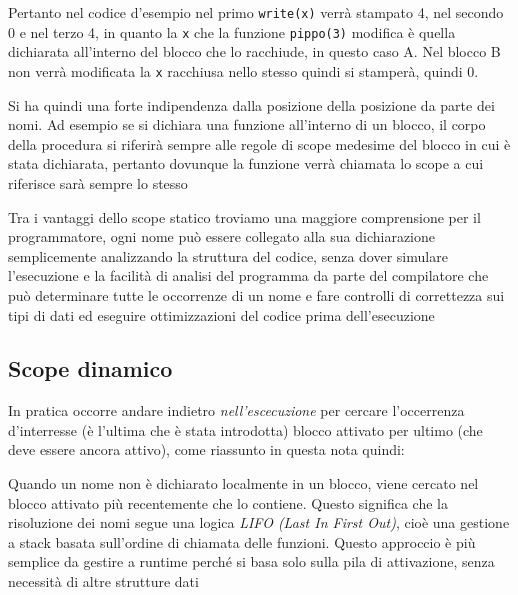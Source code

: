 Pertanto nel codice d'esempio nel primo \texttt{write(x)} verrà stampato 4, nel secondo 0 e nel terzo 4, in quanto la \texttt{x} che la funzione \texttt{pippo(3)} modifica è quella dichiarata all'interno del blocco che lo racchiude, in questo caso A. Nel blocco B non verrà modificata la \texttt{x} racchiusa nello stesso quindi si stamperà, quindi 0.

Si ha quindi una forte indipendenza dalla posizione della posizione da parte dei nomi. Ad esempio se si dichiara una funzione all'interno di un blocco, il corpo della procedura si riferirà sempre alle regole di scope medesime del blocco in cui è stata dichiarata, pertanto dovunque la funzione verrà chiamata lo scope a cui riferisce sarà sempre lo stesso

Tra i vantaggi dello scope statico troviamo una maggiore comprensione per il programmatore, ogni nome può essere collegato alla sua dichiarazione semplicemente analizzando la struttura del codice, senza dover simulare l’esecuzione e la facilità di analisi del programma da parte del compilatore che può determinare tutte le occorrenze di un nome e fare controlli di correttezza sui tipi di dati ed eseguire ottimizzazioni del codice prima dell’esecuzione



\subsection{Scope dinamico}

In pratica occorre andare indietro \textit{nell'escecuzione} per cercare l'occerrenza d'interresse (è l'ultima che è stata introdotta) blocco attivato per ultimo (che deve essere ancora attivo), come riassunto in questa nota quindi:


Quando un nome non è dichiarato localmente in un blocco, viene cercato nel blocco attivato più recentemente che lo contiene.
Questo significa che la risoluzione dei nomi segue una logica \textit{LIFO (Last In First Out)}, cioè una gestione a stack basata sull’ordine di chiamata delle funzioni. Questo approccio è più semplice da gestire a runtime perché si basa solo sulla pila di attivazione, senza necessità di altre strutture dati


